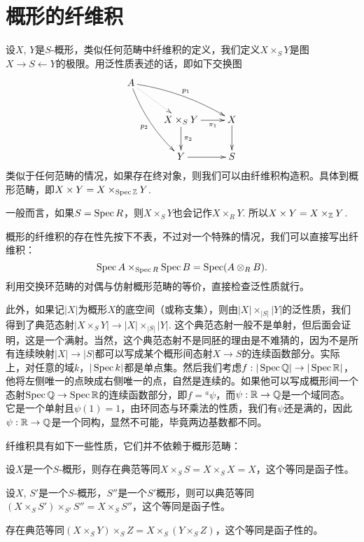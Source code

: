\section{概形的纤维积}

\begin{para}[纤维积]
设$X$, $Y$是$S$-概形，类似任何范畴中纤维积的定义，我们定义$X\times_S Y$是图$X\to S\leftarrow Y$的极限。用泛性质表述的话，即如下交换图
\[
\begin{xy}
	\xymatrix{
		A\ar@/_/[rdd]_{p_2}\ar@/^/[drr]^{p_1}\ar@{.>}[dr]&&\\
		&X\times_S Y\ar[d]^{\pi_2}\ar[r]_-{\pi_1}&X\ar[d]\\
		&Y\ar[r]&S
	}
\end{xy}
\]
类似于任何范畴的情况，如果存在终对象，则我们可以由纤维积构造积。具体到概形范畴，即$X\times Y=X\times_{\operatorname{Spec} \mathbb{Z}} Y$.

一般而言，如果$S=\operatorname{Spec} R$，则$X\times_S Y$也会记作$X\times_R Y$. 所以$X\times Y=X\times_{\mathbb{Z}} Y$.
\end{para}

概形的纤维积的存在性先按下不表，不过对一个特殊的情况，我们可以直接写出纤维积：
\[
	\operatorname{Spec} A\times_{\operatorname{Spec} R} \operatorname{Spec} B=\operatorname{Spec}(A\otimes_R B).
\]
利用交换环范畴的对偶与仿射概形范畴的等价，直接检查泛性质就行。

此外，如果记$|X|$为概形$X$的底空间（或称支集），则由$|X|\times_{|S|}|Y|$的泛性质，我们得到了典范态射$|X\times_S Y|\to |X|\times_{|S|}|Y|$. 这个典范态射一般不是单射，但后面会证明，这是一个满射。当然，这个典范态射不是同胚的理由是不难猜的，因为不是所有连续映射$|X|\to |S|$都可以写成某个概形间态射$X\to S$的连续函数部分。实际上，对任意的域$k$，$|\operatorname{Spec} k|$都是单点集。然后我们考虑$f:|\operatorname{Spec} \mathbb{Q}|\to |\operatorname{Spec} \mathbb{R}|$，他将左侧唯一的点映成右侧唯一的点，自然是连续的。如果他可以写成概形间一个态射$\operatorname{Spec} \mathbb{Q}\to \operatorname{Spec} \mathbb{R}$的连续函数部分，即$f={}^a\psi$，而$\psi:\mathbb{R}\to \mathbb{Q}$是一个域同态。它是一个单射且$\psi(1)=1$，由环同态与环乘法的性质，我们有$\psi$还是满的，因此$\psi:\mathbb{R}\to \mathbb{Q}$是一个同构，显然不可能，毕竟两边基数都不同。

\begin{pro}
纤维积具有如下一些性质，它们并不依赖于概形范畴：
\begin{compactenum}[~~~1.]
\item 设$X$是一个$S$-概形，则存在典范等同$X\times_S S=X\times_S X=X$，这个等同是函子性。
\item 设$X$, $S'$是一个$S$-概形，$S''$是一个$S'$概形，则可以典范等同$(X\times_S S')\times_{S'}S''=X\times_S S''$，这个等同是函子性。
\item 存在典范等同$(X\times_S Y)\times_S Z=X\times_S (Y\times_S Z)$，这个等同是函子性的。
\end{compactenum}
\end{pro}

